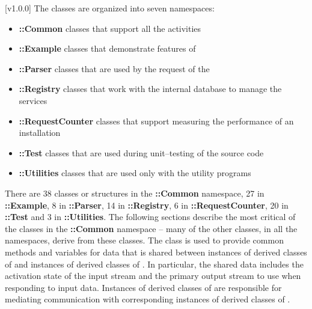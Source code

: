 [v1.0.0]
The \mplusm{} classes are organized into seven namespaces:
\begin{itemize}
\item \textbf{\mplusm{}::Common} classes that support all the \mplusm{} activities
\item \textbf{\mplusm{}::Example} classes that demonstrate features of \mplusm{}
\item \textbf{\mplusm{}::Parser} classes that are used by the
 request of the
\item \textbf{\mplusm{}::Registry} classes that work with the internal database to manage
the \mplusm{} services
\item \textbf{\mplusm{}::RequestCounter} classes that support measuring the performance
of an \mplusm{} installation
\item \textbf{\mplusm{}::Test} classes that are used during unit--testing of the \mplusm{}
source code
\item \textbf{\mplusm{}::Utilities} classes that are used only with the \mplusm{}
utility programs
\end{itemize}
There are 38 classes or structures in the \textbf{\mplusm{}::Common} namespace, 27 in
\textbf{\mplusm{}::Example}, 8 in \textbf{\mplusm{}::Parser}, 14 in
\textbf{\mplusm{}::Registry}, 6 in \textbf{\mplusm{}::RequestCounter}, 20 in
\textbf{\mplusm{}::Test} and 3 in \textbf{\mplusm{}::Utilities}.
The following sections describe the most critical of the classes in the
\textbf{\mplusm{}::Common} namespace -- many of the other classes, in all the namespaces,
derive from these classes. 
The class  is used to
provide common methods and variables for data that is shared between instances of
derived classes of  and instances of derived
classes of .
In particular, the shared data includes the activation state of the input stream and the
primary output stream to use when responding to input data.
Instances of derived classes of 
are responsible for mediating \mplusm{} communication with corresponding instances of
derived classes of .\\

